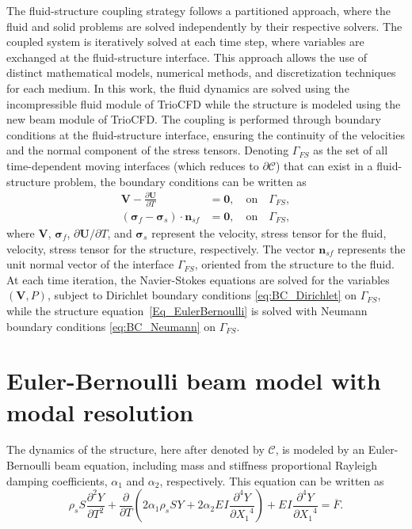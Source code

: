 The fluid-structure coupling strategy follows a partitioned approach, where the fluid and solid problems are solved independently by their respective solvers. The coupled system is iteratively solved at each time step, where variables are exchanged at the fluid-structure interface. This approach allows the use of distinct mathematical models, numerical methods, and discretization techniques for each medium. In this work, the fluid dynamics are solved using the incompressible fluid module of TrioCFD while the structure is modeled using the new beam module of TrioCFD.  The coupling is performed through boundary conditions at the fluid-structure interface, ensuring the continuity of the velocities and the normal component of the stress tensors. Denoting \({\Gamma}_{FS}\) as the set of all time-dependent moving interfaces (which reduces to $\partial\mathcal{C}$) that can exist in a fluid-structure problem, the boundary conditions can be written as
\begin{subequations}\label{eq:BC_on_IFS}
  \begin{align}
  \label{eq:BC_Dirichlet}
{\mathbf{V}} - \frac{\partial{{\mathbf{U}}}}{\partial T}&={\mathbf{0}},\quad \text{on}\quad  {\Gamma}_{FS},\\  
\label{eq:BC_Neumann}
\left({\boldsymbol{\sigma}}_{f} -{\boldsymbol{\sigma}}_{s}\right)\cdot {\mathbf{n}}_{sf}&= {\mathbf{0}},\quad \text{on}\quad  {\Gamma}_{FS},
\end{align}
\end{subequations} 
where \(\mathbf{V}\), \({\boldsymbol{\sigma}}_{f}\), \(\partial {\mathbf{U}}/\partial T\), and \({\boldsymbol{\sigma}}_{s}\) represent the velocity, stress tensor for the fluid, velocity, stress tensor for the structure, respectively. The vector \({\mathbf{n}}_{sf}\) represents the unit normal vector of the interface ${\Gamma}_{FS}$, oriented from the structure to the fluid. 
At each time iteration, the Navier-Stokes equations are solved for the variables \(({\mathbf{V}}, P)\), subject to Dirichlet boundary conditions \eqref{eq:BC_Dirichlet} on \(\Gamma_{FS}\), while the structure equation~\eqref{Eq_EulerBernoulli} is solved with Neumann boundary conditions \eqref{eq:BC_Neumann} on \(\Gamma_{FS}\).

\section{Euler-Bernoulli beam model with modal resolution}

The dynamics of the structure, here after denoted by ${\mathcal{C}}$,  is modeled by an Euler-Bernoulli beam equation, including mass and stiffness proportional Rayleigh damping coefficients, $\alpha_1$ and $\alpha_2$, respectively. This equation can be written as
\begin{equation}
\label{Eq_EulerBernoulli}
\rho_{s} S_{} \frac{\partial^{2} Y_{}}{\partial T^{2}}+\frac{\partial}{\partial T}\left(2\alpha_1 \rho_{s} S_{} Y_{}+2\alpha_2 E_{} I_{} \frac{\partial^{4} Y_{}}{\partial {X_1}^{4}}\right)+E_{} I_{} \frac{\partial^{4} Y_{}}{\partial {X_1}^{4}}= \overline{F}.
\end{equation}

